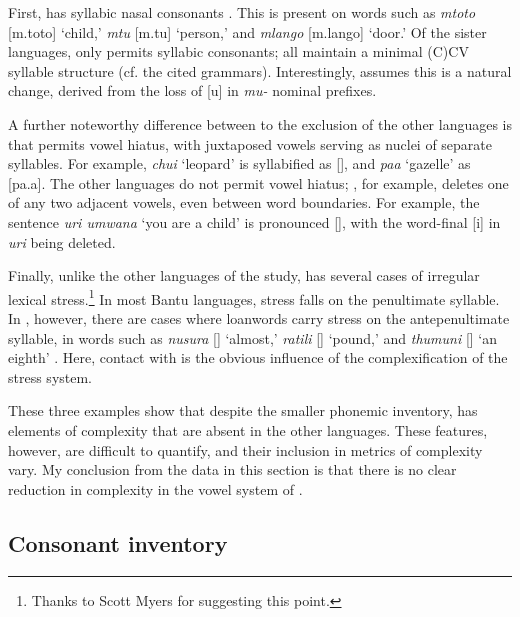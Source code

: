 \documentclass[output=paper,
modfonts
]{langscibook}
\begin{document}
 First,  has syllabic nasal consonants \citep{Ashton1966}. This is present on words such as \emph{mtoto} [m.toto] `child,' \emph{mtu} [m.tu] `person,' and \emph{mlango} [m.lango] `door.' Of the sister languages, only  permits syllabic consonants; all maintain a minimal (C)CV syllable structure (cf. the cited grammars). Interestingly, \citet{Hyman2003} assumes this is a natural change, derived from the loss of [u] in \emph{mu-} nominal prefixes.

 A further noteworthy difference between  to the exclusion of the other languages is that  permits vowel hiatus, with juxtaposed vowels serving as nuclei of separate syllables. For example, \emph{chui} `leopard' is syllabified as [], and \emph{paa} `gazelle' as [pa.a]. The other languages do not permit vowel hiatus; , for example, deletes one of any two adjacent vowels, even between word boundaries. For example, the sentence \emph{uri umwana} `you are a child' is pronounced [], with the word-final [i] in \emph{uri} being deleted. 
	
	
 Finally, unlike the other languages of the study,  has several cases of irregular lexical stress.\footnote{Thanks to Scott Myers for suggesting this point.}  In most Bantu languages, stress falls on the penultimate syllable. In , however, there are cases where  loanwords carry stress on the antepenultimate syllable, in words such as \emph{nusura} [] `almost,' \emph{ratili} [] `pound,' and \emph{thumuni} [] `an eighth' \citep{Ashton1966}. Here, contact with  is the obvious influence of the complexification of the  stress system. 

 These three examples show that despite the smaller phonemic inventory,  has elements of complexity that are absent in the other languages. These features, however, are difficult to quantify, and their inclusion in metrics of complexity vary. My conclusion from the data in this section is that there is no clear reduction in complexity in the vowel system of .  

 \subsection{Consonant inventory}%
\end{document}
